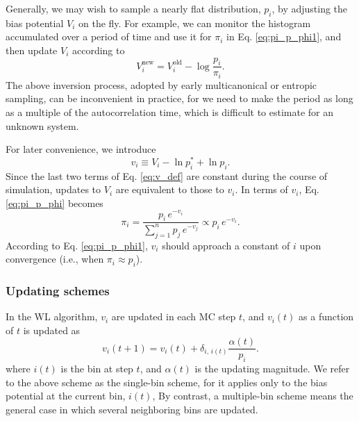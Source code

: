 \documentclass[reprint]{revtex4-1}
\begin{document}
Generally, we may wish to sample
a nearly flat distribution\cite{dayal2004, trebst2004}, $p_i$,
by adjusting the bias potential $V_i$
on the fly.
%
For example,
we can monitor the histogram accumulated over
a period of time and use it for $\pi_i$ in
Eq. \eqref{eq:pi_p_phi1},
and then update
$V_i$ according to
$$
V_i^{\mathrm{new}}
=
V_i^{\mathrm{old}}
-
\log \frac{ p_i } { \pi_i }.
$$
%
%
The above inversion process,
adopted by early multicanonical or
entropic sampling\cite{berg1992, lee1993},
can be inconvenient in practice,
for we need to make the period
as long as a multiple of
the autocorrelation time,
which is difficult to estimate for an unknown system.


For later convenience, we introduce
%
\begin{equation}
  v_i \equiv V_i - \ln p^*_i + \ln p_i.
  \label{eq:v_def}
\end{equation}
%
Since the last two terms of Eq. \eqref{eq:v_def}
are constant during the course of simulation,
updates to $V_i$ are equivalent to those to $v_i$.
%
In terms of $v_i$, Eq. \eqref{eq:pi_p_phi}
becomes
%
\begin{equation}
  \pi_i
  =
  \frac{                p_i \, e^{-v_i} }
       { \sum_{j = 1}^n p_j \, e^{-v_j} }
  \propto
  p_i \, e^{-v_i}.
  \label{eq:pi_p_v}
\end{equation}
%
According to Eq. \eqref{eq:pi_p_phi1},
$v_i$ should approach a constant of $i$
upon convergence (i.e., when $\pi_i \approx p_i$).




\subsubsection{Updating schemes}



In the WL algorithm\cite{wang2001, wang2001pre},
$v_i$ are updated
in each MC step $t$,
and $v_i(t)$ as a function of $t$
is updated as
%
\begin{equation}
  v_i(t+1)
  =
  v_i(t)
  +
  \delta_{i, \, i(t)}
  \frac{ \alpha(t) } { p_i }.
  \label{eq:wl_update}
\end{equation}
%
where $i(t)$ is the bin at step $t$,
and $\alpha(t)$ is the updating magnitude.
%
We refer to the above scheme as the single-bin scheme,
for it applies only to the bias potential
at the current bin, $i(t)$,
%
By contrast, a multiple-bin scheme
means the general case in which
several neighboring bins are updated.
\end{document}
